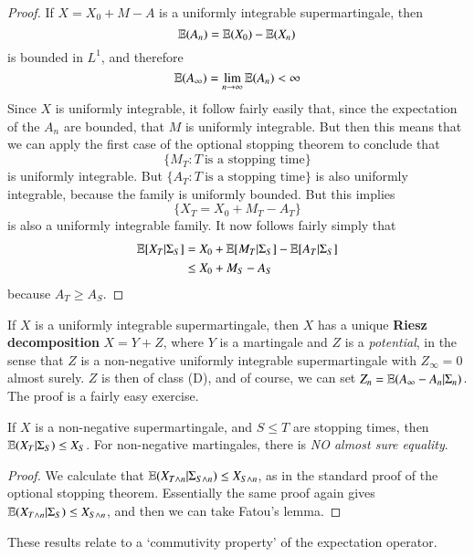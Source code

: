 \begin{proof}
    If $X = X_0 + M - A$ is a uniformly integrable supermartingale, then
    \[ \operatorname{\mathbb{E}}(A_n) = \operatorname{\mathbb{E}}(X_0) - \operatorname{\mathbb{E}}(X_n) \]
    is bounded in $L^1$, and therefore
    \[ \operatorname{\mathbb{E}}(A_\infty) = \lim_{n \to \infty} \operatorname{\mathbb{E}}(A_n) < \infty \]
    Since $X$ is uniformly integrable, it follow fairly easily that, since the expectation of the $A_n$ are bounded, that $M$ is uniformly integrable. But then this means that we can apply the first case of the optional stopping theorem to conclude that
    \[ \{ M_T: T\ \text{is a stopping time} \} \]
    is uniformly integrable. But $\{ A_T: T\ \text{is a stopping time} \}$ is also uniformly integrable, because the family is uniformly bounded. But this implies
    \[ \{ X_T = X_0 + M_T - A_T \} \]
    is also a uniformly integrable family. It now follows fairly simply that
    \begin{align*}
        \operatorname{\mathbb{E}}[X_T|\Sigma_S] &= X_0 + \operatorname{\mathbb{E}}[M_T|\Sigma_S] - \operatorname{\mathbb{E}}[A_T|\Sigma_S]\\
        &\leq X_0 + M_S - A_S
    \end{align*}
    because $A_T \geq A_S$.
\end{proof}

If $X$ is a uniformly integrable supermartingale, then $X$ has a unique {\bf Riesz decomposition} $X = Y + Z$, where $Y$ is a martingale and $Z$ is a {\it potential}, in the sense that $Z$ is a non-negative uniformly integrable supermartingale with $Z_\infty = 0$ almost surely. $Z$ is then of class (D), and of course, we can set $Z_n = \operatorname{\mathbb{E}}(A_\infty - A_n|\Sigma_n)$. The proof is a fairly easy exercise.

\begin{theorem}
    If $X$ is a non-negative supermartingale, and $S \leq T$ are stopping times, then $\operatorname{\mathbb{E}}(X_T|\Sigma_S) \leq X_S$. For non-negative martingales, there is {\it NO almost sure equality}.
\end{theorem}
\begin{proof}
    We calculate that $\operatorname{\mathbb{E}}(X_{T \wedge n} | \Sigma_{S \wedge n}) \leq X_{S \wedge n}$, as in the standard proof of the optional stopping theorem. Essentially the same proof again gives $\operatorname{\mathbb{E}}(X_{T \wedge n}|\Sigma_S) \leq X_{S \wedge n}$, and then we can take Fatou's lemma.
\end{proof}

These results relate to a `commutivity property' of the expectation operator.

